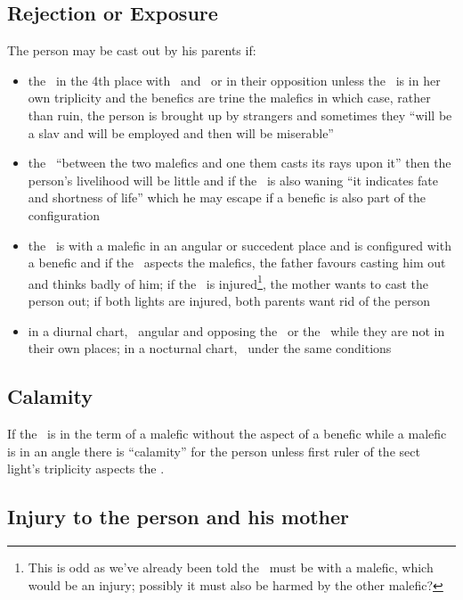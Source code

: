 \subsection{Rejection or Exposure}
The person may be cast out by his parents if:
\begin{itemize}
\item the \Moon\, in the 4th place with \Saturn\, and \Mars\, or in their opposition unless the \Moon\, is in her own triplicity and the benefics are trine the malefics in which case, rather than ruin, the person is brought up by strangers and sometimes they ``will be a slav and will be employed and then will be miserable''

\item the \Moon\, ``between the two malefics and one them casts its rays upon it'' then the person's livelihood will be little and if the \Moon\, is also waning ``it indicates fate and shortness of life'' which he may escape if a benefic is also part of the configuration

\item the \Moon\, is with a malefic in an angular or succedent place and is configured with a benefic and if the \Sun\, aspects the malefics, the father favours casting him out and thinks badly of him; if the \Moon\, is injured\footnote{This is odd as we've already been told the \Moon\, must be with a malefic, which would be an injury; possibly it must also be harmed by the other malefic?}, the mother wants to cast the person out; if both lights are injured, both parents want rid of the person

\item in a diurnal chart, \Mars\, angular and opposing the \Moon\, or the \Sun\, while they are not in their own places; in a nocturnal chart, \Saturn\, under the same conditions
\end{itemize}

\subsection{Calamity}

If the \Moon\, is in the term of a malefic without the aspect of a benefic while a malefic is in an angle there is ``calamity'' for the person unless first ruler of the sect light's triplicity aspects the \Moon.

\subsection{Injury to the person and his mother}

